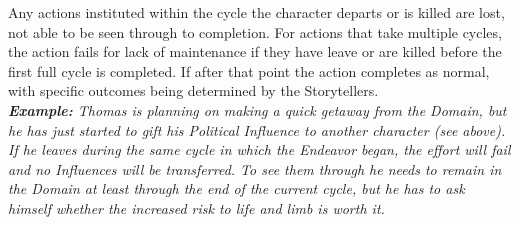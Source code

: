 Any actions instituted within the cycle the character departs or is killed are lost, not able to be seen through to 
completion.  For actions that take multiple cycles, the action fails for lack of maintenance if they have leave or 
are killed before the first full cycle is completed.  If after that point the action completes as normal, with 
specific outcomes being determined by the Storytellers. \\

\emph{\textbf{Example:} Thomas is planning on making a quick getaway from the Domain, but he has just started to 
gift his \emph{Political} Influence to another character (see above).  If he leaves during the same cycle in which 
the \emph{Endeavor} began, the effort will fail and no Influences will be transferred.  To see them through he needs 
to remain in the Domain at least through the end of the current cycle, but he has to ask himself whether the 
increased risk to life and limb is worth it.}